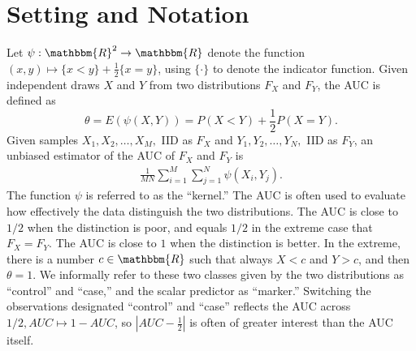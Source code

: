 \documentclass[12pt]{article}
\newcommand{\E}{E}
\renewcommand{\P}{P}
\newcommand{\kernel}{\psi}
\newcommand{\comment}[1]{
  \iftoggle{commenttoggle}{
    {\normalsize{\color{red}{ #1}}\normalsize}
  }
  {}
}
\begin{document}
\section{Setting and Notation}\label{section:setting}

Let $\kernel:\mathbbm{R}^2\to\mathbbm{R}$ denote the function
$(x,y)\mapsto\{x<y\}+\frac{1}{2}\{x=y\}$, using $\{\cdot\}$ to denote the indicator function. Given independent draws $X$ and $Y$ from two distributions $F_X$ and $F_Y$, the AUC is defined as
$$\theta=\E(\kernel(X,Y))=\P(X<Y)+\frac{1}{2}\P(X=Y).$$%
Given samples
$X_1,X_2,\ldots,X_M,$ IID as $F_X$ and $Y_1,Y_2,\ldots,Y_N,$ IID as
$F_Y$, an unbiased estimator of the AUC of $F_X$ and $F_Y$ is %
\begin{align}
  \frac{1}{MN}\sum_{i=1}^M\sum_{j=1}^N \psi(X_i,Y_j).
\end{align}
The function
$\kernel$ is referred to as the ``kernel.'' The AUC is often used to
evaluate how effectively the data distinguish the two
distributions. The AUC is close to
$1/2$ when the distinction is poor, and equals
$1/2$ in the extreme case that $F_X=F_Y$. The AUC is close to
$1$ when the distinction is better. In the extreme, there is a number
$c\in\mathbbm{R}$ such that always $X<c$ and
$Y>c$, and then
$\theta=1$. We informally refer to these two classes given by the two
distributions as ``control'' and ``case,'' and the scalar predictor as ``marker.'' %
 Switching the observations designated
``control'' and ``case'' reflects the AUC across $1/2, AUC\mapsto
1-AUC$, so
$|AUC-\frac{1}{2}|$ is often of greater interest than the AUC itself.
\end{document}
